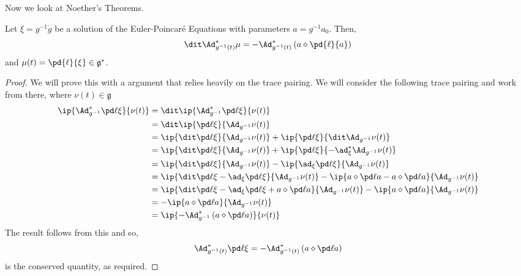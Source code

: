 \noindent
Now we look at Noether's Theorems.
\begin{nthm}
  Let $\xi = g^{-1}\dot g$ be a solution of the Euler-Poincar\'e Equations with parameters $a = g^{-1}a_0$. Then,
  $$ \dit \Ad^*_{g^{-1}(t)} \mu = -\Ad^*_{g^{-1}(t)} \left(a \diamond \pd{\ell}{a}\right) $$
  and $\mu(t) = \pd{\ell}{\xi} \in \mathfrak{g}^*$.
\end{nthm}
\begin{proof}
  We will prove this with a argument that relies heavily on the trace pairing. We will consider the following trace pairing and work from there, where $\nu(t) \in \mathfrak{g}$
  \begin{align*}
    \ip{\Ad_{g^{-1}}^* \pd \ell \xi}{\nu(t)} &= \dit \ip{\Ad_{g^{-1}}^* \pd \ell \xi}{\nu(t)} \\
    &= \dit\ip{ \pd \ell \xi}{\Ad_{g^{-1}}\nu(t)} \\
    &= \ip{ \dit\pd \ell \xi}{\Ad_{g^{-1}}\nu(t)} + \ip{ \pd \ell \xi}{\dit\Ad_{g^{-1}}\nu(t)} \\
    &= \ip{ \dit\pd \ell \xi}{\Ad_{g^{-1}}\nu(t)} + \ip{ \pd \ell \xi}{-\ad^*_\xi\Ad_{g^{-1}}\nu(t)} \\
    &= \ip{ \dit\pd \ell \xi}{\Ad_{g^{-1}}\nu(t)} - \ip{\ad_\xi \pd \ell \xi}{\Ad_{g^{-1}}\nu(t)} \\
    &= \ip{ \dit\pd \ell \xi - \ad_\xi \pd \ell \xi}{\Ad_{g^{-1}}\nu(t)} - \ip{a\diamond \pd \ell a - a \diamond \pd \ell a}{\Ad_{g^{-1}}\nu(t)} \\
    &= \ip{ \dit\pd \ell \xi - \ad_\xi \pd \ell \xi + a\diamond \pd \ell a}{\Ad_{g^{-1}}\nu(t)} - \ip{a \diamond \pd \ell a}{\Ad_{g^{-1}}\nu(t)} \\
    &= - \ip{a \diamond \pd \ell a}{\Ad_{g^{-1}}\nu(t)} \\
    &= \ip{-\Ad^*_{g^{-1}}\left(a \diamond \pd \ell a\right)}{\nu(t)}
  \end{align*}
  The result follows from this and so,
  $$ \Ad_{g^{-1}(t)}^* \pd \ell \xi = -\Ad^*_{g^{-1}(t)}\left(a \diamond \pd \ell a\right) $$
  is the conserved quantity, as required.
\end{proof}

